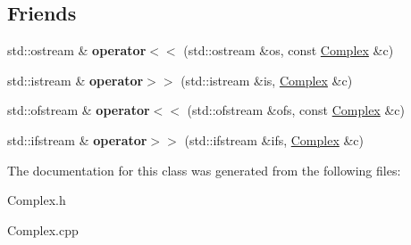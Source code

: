 \subsection*{Friends}
\begin{DoxyCompactItemize}
\item 
\hypertarget{class_complex_afadd32f8e2e73f144410ca2b30a30b9f}{std\-::ostream \& {\bfseries operator$<$$<$} (std\-::ostream \&os, const \hyperlink{class_complex}{Complex} \&c)}\label{class_complex_afadd32f8e2e73f144410ca2b30a30b9f}

\item 
\hypertarget{class_complex_a02809645f4803e3f50ccb4b962305bbc}{std\-::istream \& {\bfseries operator$>$$>$} (std\-::istream \&is, \hyperlink{class_complex}{Complex} \&c)}\label{class_complex_a02809645f4803e3f50ccb4b962305bbc}

\item 
\hypertarget{class_complex_aea1716027688b80f38e831c86192839e}{std\-::ofstream \& {\bfseries operator$<$$<$} (std\-::ofstream \&ofs, const \hyperlink{class_complex}{Complex} \&c)}\label{class_complex_aea1716027688b80f38e831c86192839e}

\item 
\hypertarget{class_complex_a7d36a3264413c6833cb121704f165d88}{std\-::ifstream \& {\bfseries operator$>$$>$} (std\-::ifstream \&ifs, \hyperlink{class_complex}{Complex} \&c)}\label{class_complex_a7d36a3264413c6833cb121704f165d88}

\end{DoxyCompactItemize}


The documentation for this class was generated from the following files\-:\begin{DoxyCompactItemize}
\item 
Complex.\-h\item 
Complex.\-cpp\end{DoxyCompactItemize}
